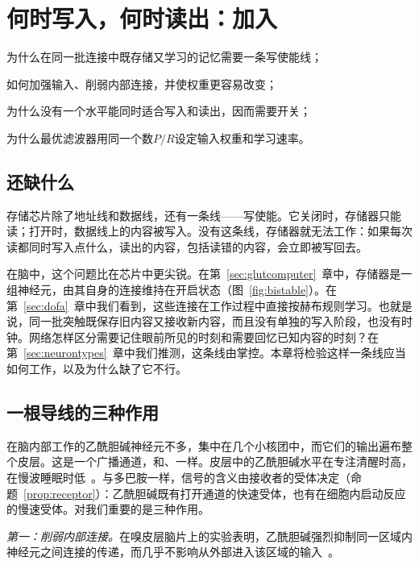 \chapter{何时写入，何时读出：加入}
\label{sec:acet}
\begin{chaptergoals}
\item 为什么在同一批连接中既存储又学习的记忆需要一条写使能线；
\item {}如何加强输入、削弱内部连接，并使权重更容易改变；
\item 为什么没有一个水平能同时适合写入和读出，因而需要开关；
\item 为什么最优滤波器用同一个数$P/R$设定输入权重和学习速率。
\end{chaptergoals}

\section{还缺什么}

存储芯片除了地址线和数据线，还有一条线——写使能。它关闭时，存储器只能读；打开时，数据线上的内容被写入。没有这条线，存储器就无法工作：如果每次读都同时写入点什么，读出的内容，包括读错的内容，会立即被写回去。

在脑中，这个问题比在芯片中更尖锐。在第~\ref{sec:glutcomputer}~章中，存储器是一组神经元，由其自身的连接维持在开启状态（图~\ref{fig:bistable}）。在第~\ref{sec:dofa}~章中我们看到，这些连接在工作过程中直接按赫布规则学习。也就是说，同一批突触既保存旧内容又接收新内容，而且没有单独的写入阶段，也没有时钟。网络怎样区分需要记住眼前所见的时刻和需要回忆已知内容的时刻？在第~\ref{sec:neurontypes}~章中我们推测，这条线由掌控。本章将检验这样一条线应当如何工作，以及为什么缺了它不行。

\section{一根导线的三种作用}

在脑内部工作的乙酰胆碱神经元不多，集中在几个小核团中，而它们的输出遍布整个皮层。这是一个广播通道，和、一样。皮层中的乙酰胆碱水平在专注清醒时高，在慢波睡眠时低~\cite{Hasselmo1999}。与多巴胺一样，信号的含义由接收者的受体决定（命题~\ref{prop:receptor}）：乙酰胆碱既有打开通道的快速受体，也有在细胞内启动反应的慢速受体。对我们重要的是三种作用。

\emph{第一：削弱内部连接。}在嗅皮层脑片上的实验表明，乙酰胆碱强烈抑制同一区域内神经元之间连接的传递，而几乎不影响从外部进入该区域的输入~\cite{HasselmoBower1992}。

